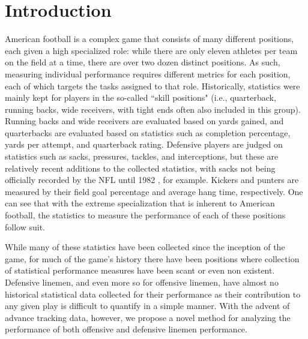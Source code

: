 \documentclass[USenglish]{article}
\theoremstyle{dgthm}
\theoremstyle{dgdef}
\begin{document}

\maketitle
	
	
\section{Introduction} \label{introduction}
American football is a complex game that consists of many different positions, each given a high specialized role:  while there are only eleven athletes per team on the field at a time, there are over two dozen distinct positions. As such, measuring individual performance requires different metrics for each position, each of which targets the tasks assigned to that role.  Historically, statistics were mainly kept for players in the so-called ``skill positions" (i.e., quarterback, running backs, wide receivers, with tight ends often also included in this group). Running backs and wide receivers are evaluated based on yards gained, and quarterbacks are evaluated based on statistics such as completion percentage, yards per attempt, and quarterback rating.  Defensive players are judged on statistics such as sacks, pressures, tackles, and interceptions, but these are relatively recent additions to the collected statistics, with sacks not being officially recorded by the NFL until 1982 \citep{treacy2026sack}, for example.  Kickers and punters are measured by their field goal percentage and average hang time, respectively.  One can see that with the extreme specialization that is inherent to American football, the statistics to measure the performance of each of these positions follow suit.  

While many of these statistics have been collected since the inception of the game, for much of the game's history there have been positions where collection of statistical performance measures have been scant or even non existent. Defensive linemen, and even more so for offensive linemen, have almost no historical statistical data collected for their performance as their contribution to any given play is difficult to quantify in a simple manner.  With the advent of advance tracking data, however, we propose a novel method for analyzing the performance of both offensive and defensive linemen performance.  
\end{document}
